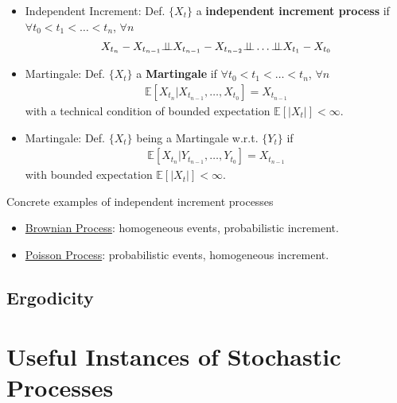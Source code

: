 \begin{itemize}[topsep=2pt,itemsep=0pt]
    \item Independent Increment: Def. $ \{X_t\} $ a \textbf{independent increment process} if $ \forall t_0<t_1<\ldots<t_n $, $ \forall n $
\begin{align}
    X_{t_{n}}-X_{t_{n-1}}\independent X_{t_{n-1}}-X_{t_{n-2}} \independent \ldots\independent X_{t_1}-X_{t_0}
\end{align}
    \item Martingale: Def. $ \{X_t\}  $ a \textbf{Martingale} if $ \forall t_0<t_1<\ldots<t_n $, $ \forall n $
    \begin{align}
        \mathbb{E}\left[ X_{t_n}|X_{t_{n-1}},\ldots,X_{t_0} \right] = X_{t_{n-1}} 
    \end{align}
    with a technical condition of bounded expectation $ \mathbb{E}\left[ |X_t| \right] <\infty $.
    \item Martingale: Def. $ \{X_t\}  $ being a Martingale w.r.t. $ \{Y_t\} $ if
    \begin{align}
        \mathbb{E}\left[ X_{t_n}|Y_{t_{n-1}},\ldots,Y_{t_0} \right] = X_{t_{n-1}} 
    \end{align}
    with bounded expectation $ \mathbb{E}\left[ |X_t| \right] <\infty $.

    
\end{itemize}

\begin{point}
    Concrete examples of independent increment processes
\end{point}

\begin{itemize}[topsep=2pt,itemsep=0pt]
    \item \hyperlink{BrownianProcess}{Brownian Process}: homogeneous events, probabilistic increment.
    \item \hyperlink{PoissonProcess}{Poisson Process}: probabilistic events, homogeneous increment.
\end{itemize}




\subsection{Ergodicity}






\section{Useful Instances of Stochastic Processes}

